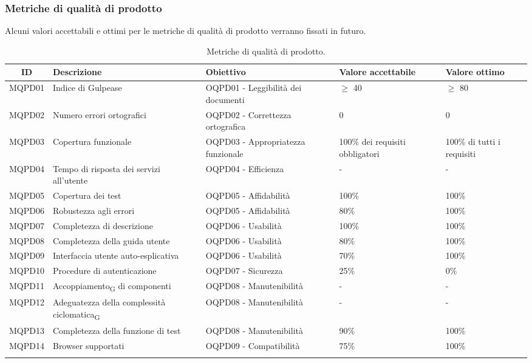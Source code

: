 \subsubsection{Metriche di qualità di prodotto}
Alcuni valori accettabili e ottimi per le metriche di qualità di prodotto verranno fissati in futuro.
\begin{table}[H]
	\centering
	\begin{tabularx}{\textwidth}{|c|X|X|X|X|}
		\hline
		\textbf{ID} & \textbf{Descrizione} & \textbf{Obiettivo} & \textbf{Valore accettabile} & \textbf{Valore ottimo}\\
		\hline
		MQPD01 & Indice di Gulpease & OQPD01 - Leggibilità dei documenti & $\geq$ 40 & $\geq$ 80 \\
		\hline
		MQPD02 & Numero errori ortografici & OQPD02 - Correttezza ortografica & 0 & 0 \\
		\hline
		MQPD03 & Copertura funzionale & OQPD03 - Appropriatezza funzionale & 100\% dei requisiti obbligatori & 100\% di tutti i requisiti\\
		\hline
		MQPD04 & Tempo di risposta dei servizi all'utente & OQPD04 - Efficienza & - & - \\
		\hline
		MQPD05 & Copertura dei test & OQPD05 - Affidabilità & 100\% & 100\% \\
		\hline
		MQPD06 & Robustezza agli errori & OQPD05 - Affidabilità & 80\% & 100\% \\
		\hline
		MQPD07 & Completezza di descrizione & OQPD06 - Usabilità & 100\% &  100\% \\
		\hline
		MQPD08 & Completezza della guida utente & OQPD06 - Usabilità & 80\% &  100\% \\
		\hline
		MQPD09 & Interfaccia utente auto-esplicativa & OQPD06 - Usabilità & 70\% &  100\% \\
		\hline
		MQPD10 & Procedure di autenticazione & OQPD07 - Sicurezza & 25\% &  0\% \\
		\hline
		MQPD11 & Accoppiamento\textsubscript{G} di componenti & OQPD08 - Manutenibilità & - & - \\
		\hline
		MQPD12 & Adeguatezza della complessità ciclomatica\textsubscript{G} & OQPD08 - Manutenibilità & - & - \\
		\hline
		MQPD13 & Completezza della funzione di test & OQPD08 - Manutenibilità & 90\% & 100\% \\
		\hline
		MQPD14 & Browser supportati & OQPD09 - Compatibilità & 75\% & 100\% \\
		\hline
		\caption{Metriche di qualità di prodotto.}
	\end{tabularx}
\end{table}
